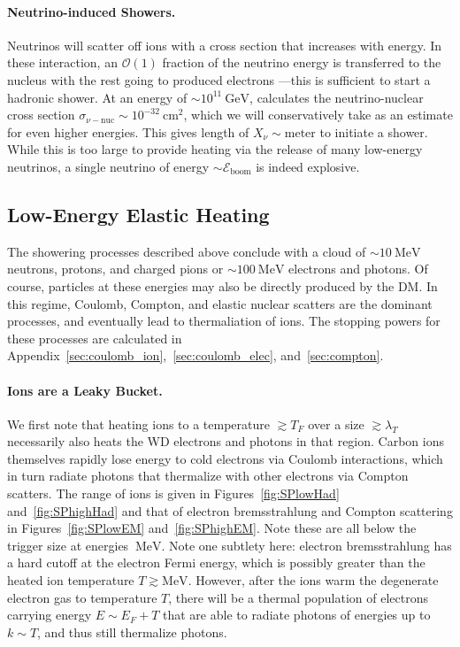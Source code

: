\documentclass[twocolumn, preprintnumbers,amsmath,amssymb,prd, superscriptaddress]{revtex4}
\newcommand{\Eboom}{\mathcal{E}_\text{boom}}
\newcommand{\OO}{\mathcal{O}}
\newcommand{\GeV}{\text{GeV}}
\newcommand{\MeV}{\text{MeV}}
\newcommand{\cm}{\text{cm}}
\begin{document}
\paragraph{Neutrino-induced Showers.}
Neutrinos will scatter off ions with a cross section that increases with energy.
In these interaction, an $\OO(1)$ fraction of the neutrino energy is transferred to the nucleus with the rest going to produced electrons \cite{Formaggio:2013kya}---this is sufficient to start a hadronic shower.
At an energy of $\sim 10^{11} ~\GeV$, \cite{Formaggio:2013kya} calculates the neutrino-nuclear cross section $\sigma_{\nu-\text{nuc}} \sim 10^{-32} ~\cm^2$, which we will conservatively take as an estimate for even higher energies.
This gives length of $X_\nu \sim \text{meter}$ to initiate a shower.
While this is too large to provide heating via the release of many low-energy neutrinos, a single neutrino of energy $\sim \Eboom$ is indeed explosive.


\subsection{Low-Energy Elastic Heating}

The showering processes described above conclude with a cloud of $\sim 10~\MeV$ neutrons, protons, and charged pions or $\sim 100~\MeV$ electrons and photons.
Of course, particles at these energies may also be directly produced by the DM.
In this regime, Coulomb, Compton, and elastic nuclear scatters are the dominant processes, and eventually lead to thermaliation of ions.
The stopping powers for these processes are calculated in Appendix~\ref{sec:coulomb_ion},~\ref{sec:coulomb_elec}, and~\ref{sec:compton}.

\paragraph{Ions are a Leaky Bucket.}
We first note that heating ions to a temperature $\gtrsim T_F$ over a size $\gtrsim \lambda_T$ necessarily also heats the WD electrons and photons in that region.
Carbon ions themselves rapidly lose energy to cold electrons via Coulomb interactions, which in turn radiate photons that thermalize with other electrons via Compton scatters.
The range of ions is given in Figures~\ref{fig:SPlowHad} and~\ref{fig:SPhighHad} and that of electron bremsstrahlung and Compton scattering in Figures~\ref{fig:SPlowEM} and~\ref{fig:SPhighEM}. Note these are all below the trigger size at energies $~\MeV$.
Note one subtlety here: electron bremsstrahlung has a hard cutoff at the electron Fermi energy, which is possibly greater than the heated ion temperature $T \gtrsim \MeV$.
However, after the ions warm the degenerate electron gas to temperature $T$, there will be a thermal population of electrons carrying energy $E \sim E_F + T$ that are able to radiate photons of energies up to $k\sim T$, and thus still thermalize photons.
\end{document}
